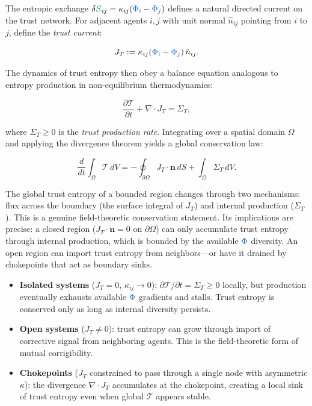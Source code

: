 \documentclass[11pt,a4paper]{article}
\newcommand{\scalar}[1]{\textcolor{scalarcolor}{\ensuremath{#1}}}
\newcommand{\entropy}[1]{\textcolor{entropycolor}{\ensuremath{#1}}}
\theoremstyle{definition}
\theoremstyle{plain}
\begin{document}
\begin{mdframed}[style=appendixbox]
The entropic exchange $\delta\entropy{S}_{ij} = \kappa_{ij}(\scalar{\Phi_i} - \scalar{\Phi_j})$ defines a natural directed current on the trust network. For adjacent agents $i, j$ with unit normal $\hat{n}_{ij}$ pointing from $i$ to $j$, define the \emph{trust current}:

\begin{equation}
J_T := \kappa_{ij}(\scalar{\Phi_i} - \scalar{\Phi_j})\,\hat{n}_{ij}.
\end{equation}

The dynamics of trust entropy then obey a balance equation analogous to entropy production in non-equilibrium thermodynamics:

\begin{equation}
\frac{\partial \mathcal{T}}{\partial t} + \nabla \cdot J_T = \Sigma_T,
\end{equation}

where $\Sigma_T \geq 0$ is the \emph{trust production rate}. Integrating over a spatial domain $\Omega$ and applying the divergence theorem yields a global conservation law:

\begin{equation}
\frac{d}{dt}\int_\Omega \mathcal{T}\,dV = -\oint_{\partial\Omega} J_T \cdot \mathbf{n}\,dS + \int_\Omega \Sigma_T\,dV.
\end{equation}

The global trust entropy of a bounded region changes through two mechanisms: flux across the boundary (the surface integral of $J_T$) and internal production ($\Sigma_T$). This is a genuine field-theoretic conservation statement. Its implications are precise: a closed region ($J_T \cdot \mathbf{n} = 0$ on $\partial\Omega$) can only accumulate trust entropy through internal production, which is bounded by the available $\scalar{\Phi}$ diversity. An open region can import trust entropy from neighbors---or have it drained by chokepoints that act as boundary sinks.

\begin{itemize}
\item \textbf{Isolated systems} ($J_T = 0$, $\kappa_{ij} \to 0$): $\partial\mathcal{T}/\partial t = \Sigma_T \geq 0$ locally, but production eventually exhausts available $\scalar{\Phi}$ gradients and stalls. Trust entropy is conserved only as long as internal diversity persists.
\item \textbf{Open systems} ($J_T \neq 0$): trust entropy can grow through import of corrective signal from neighboring agents. This is the field-theoretic form of mutual corrigibility.
\item \textbf{Chokepoints} ($J_T$ constrained to pass through a single node with asymmetric $\kappa$): the divergence $\nabla \cdot J_T$ accumulates at the chokepoint, creating a local sink of trust entropy even when global $\mathcal{T}$ appears stable.
\end{itemize}


\end{mdframed}
\end{document}
